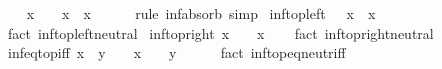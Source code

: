 \begin{isabellebody}
%
\isadelimproof
%
\endisadelimproof
%
\isatagproof
{}\isamarkupfalse%
\isanewline
\ \ \isamarkupfalse%
\ {\isachardoublequoteopen}x\ {\isasymsqinter}\ {\isasymtop}\ {\isacharequal}{\kern0pt}\ x{\isachardoublequoteclose}\ \ x\isanewline
\ \ \ \ \isamarkupfalse%
\ {\isacharparenleft}{\kern0pt}rule\ inf{\isacharunderscore}{\kern0pt}absorb{}{\isacharparenright}{\kern0pt}\ simp\isanewline
{}\isamarkupfalse%
%
\endisatagproof
{\isafoldproof}%
%
\isadelimproof
\isanewline
%
\endisadelimproof
\isanewline
{}\isamarkupfalse%
\ inf{\isacharunderscore}{\kern0pt}top{\isacharunderscore}{\kern0pt}left{\isacharcolon}{\kern0pt}\ {\isachardoublequoteopen}{\isasymtop}\ {\isasymsqinter}\ x\ {\isacharequal}{\kern0pt}\ x{\isachardoublequoteclose}\isanewline
%
\isadelimproof
\ \ %
\endisadelimproof
%
\isatagproof
{}\isamarkupfalse%
\ {\isacharparenleft}{\kern0pt}fact\ inf{\isacharunderscore}{\kern0pt}top{\isachardot}{\kern0pt}left{\isacharunderscore}{\kern0pt}neutral{\isacharparenright}{\kern0pt}%
\endisatagproof
{\isafoldproof}%
%
\isadelimproof
\isanewline
%
\endisadelimproof
\isanewline
{}\isamarkupfalse%
\ inf{\isacharunderscore}{\kern0pt}top{\isacharunderscore}{\kern0pt}right{\isacharcolon}{\kern0pt}\ {\isachardoublequoteopen}x\ {\isasymsqinter}\ {\isasymtop}\ {\isacharequal}{\kern0pt}\ x{\isachardoublequoteclose}\isanewline
%
\isadelimproof
\ \ %
\endisadelimproof
%
\isatagproof
{}\isamarkupfalse%
\ {\isacharparenleft}{\kern0pt}fact\ inf{\isacharunderscore}{\kern0pt}top{\isachardot}{\kern0pt}right{\isacharunderscore}{\kern0pt}neutral{\isacharparenright}{\kern0pt}%
\endisatagproof
{\isafoldproof}%
%
\isadelimproof
\isanewline
%
\endisadelimproof
\isanewline
{}\isamarkupfalse%
\ inf{\isacharunderscore}{\kern0pt}eq{\isacharunderscore}{\kern0pt}top{\isacharunderscore}{\kern0pt}iff{\isacharcolon}{\kern0pt}\ {\isachardoublequoteopen}x\ {\isasymsqinter}\ y\ {\isacharequal}{\kern0pt}\ {\isasymtop}\ {\isasymlongleftrightarrow}\ x\ {\isacharequal}{\kern0pt}\ {\isasymtop}\ {\isasymand}\ y\ {\isacharequal}{\kern0pt}\ {\isasymtop}{\isachardoublequoteclose}\isanewline
%
\isadelimproof
\ \ %
\endisadelimproof
%
\isatagproof
{}\isamarkupfalse%
\ {\isacharparenleft}{\kern0pt}fact\ inf{\isacharunderscore}{\kern0pt}top{\isachardot}{\kern0pt}eq{\isacharunderscore}{\kern0pt}neutr{\isacharunderscore}{\kern0pt}iff{\isacharparenright}{\kern0pt}%
\endisatagproof
{\isafoldproof}%
%
\isadelimproof
\isanewline
%
\endisadelimproof

\end{isabellebody}
